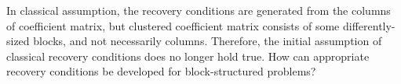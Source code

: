 In classical assumption, the recovery conditions are generated from the columns of coefficient matrix, but clustered coefficient matrix consists of some differently-sized blocks, and not necessarily columns.
Therefore, the initial assumption of classical recovery conditions does no longer hold true. 
How can appropriate recovery conditions be developed for block-structured problems?